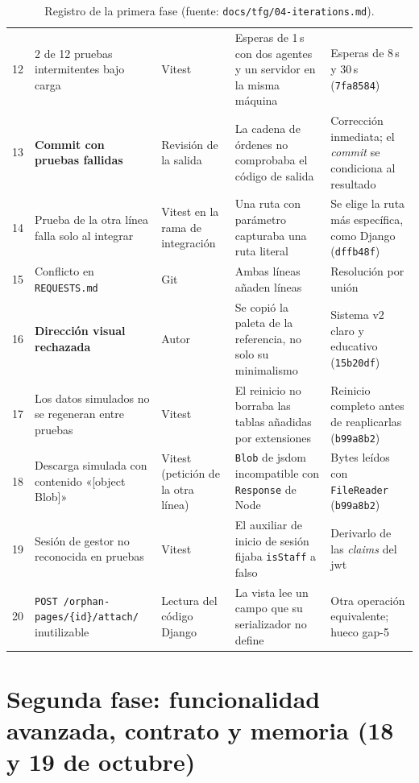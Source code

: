 \begin{table}[htbp]
\begin{tabular}{rp{}p{}p{}p{}}
    12 & 2 de 12 pruebas intermitentes bajo carga & Vitest &
      Esperas de 1\,s con dos agentes y un servidor en la misma máquina &
      Esperas de 8\,s y 30\,s (\texttt{7fa8584}) \\
    13 & \textbf{Commit con pruebas fallidas} & Revisión de la salida &
      La cadena de órdenes no comprobaba el código de salida &
      Corrección inmediata; el \textit{commit} se condiciona al resultado \\
    14 & Prueba de la otra línea falla solo al integrar & Vitest en la rama de
      integración & Una ruta con parámetro capturaba una ruta literal &
      Se elige la ruta más específica, como Django (\texttt{dffb48f}) \\
    15 & Conflicto en \texttt{REQUESTS.md} & Git & Ambas líneas añaden líneas &
      Resolución por unión \\
    16 & \textbf{Dirección visual rechazada} & Autor &
      Se copió la paleta de la referencia, no solo su minimalismo &
      Sistema v2 claro y educativo (\texttt{15b20df}) \\
    17 & Los datos simulados no se regeneran entre pruebas & Vitest &
      El reinicio no borraba las tablas añadidas por extensiones &
      Reinicio completo antes de reaplicarlas (\texttt{b99a8b2}) \\
    18 & Descarga simulada con contenido «[object Blob]» & Vitest (petición de la
      otra línea) & \texttt{Blob} de jsdom incompatible con \texttt{Response} de
      Node & Bytes leídos con \texttt{FileReader} (\texttt{b99a8b2}) \\
    19 & Sesión de gestor no reconocida en pruebas & Vitest &
      El auxiliar de inicio de sesión fijaba \texttt{isStaff} a falso &
      Derivarlo de las \textit{claims} del \acs{jwt} \\
    20 & \texttt{POST /orphan-pages/\{id\}/attach/} inutilizable & Lectura del
      código Django & La vista lee un campo que su serializador no define &
      Otra operación equivalente; hueco gap-5 \\
    \bottomrule
  \end{tabular}
  \caption{Registro de la primera fase (fuente: \texttt{docs/tfg/04-iterations.md}).\label{TAB:IT-PHASE1}}
\end{table}

\section*{Segunda fase: funcionalidad avanzada, contrato y memoria (18 y 19 de octubre)}

